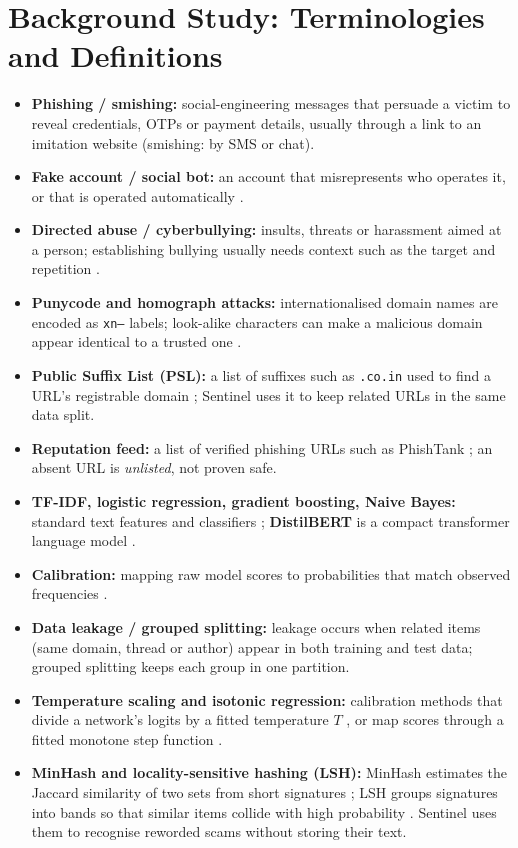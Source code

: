 \section{Background Study: Terminologies and Definitions}
\begin{itemize}
\item \textbf{Phishing / smishing:} social-engineering messages that persuade a victim to reveal credentials, OTPs or payment details, usually through a link to an imitation website (smishing: by SMS or chat).
\item \textbf{Fake account / social bot:} an account that misrepresents who operates it, or that is operated automatically \cite{lit3}.
\item \textbf{Directed abuse / cyberbullying:} insults, threats or harassment aimed at a person; establishing bullying usually needs context such as the target and repetition \cite{cad}.
\item \textbf{Punycode and homograph attacks:} internationalised domain names are encoded as \texttt{xn--} labels; look-alike characters can make a malicious domain appear identical to a trusted one \cite{homograph}.
\item \textbf{Public Suffix List (PSL):} a list of suffixes such as \texttt{.co.in} used to find a URL's registrable domain \cite{psl}; Sentinel uses it to keep related URLs in the same data split.
\item \textbf{Reputation feed:} a list of verified phishing URLs such as PhishTank \cite{phishtank}; an absent URL is \emph{unlisted}, not proven safe.
\item \textbf{TF-IDF, logistic regression, gradient boosting, Naive Bayes:} standard text features and classifiers \cite{sklearn}; \textbf{DistilBERT} is a compact transformer language model \cite{distilbert}.
\item \textbf{Calibration:} mapping raw model scores to probabilities that match observed frequencies \cite{platt,guo}.
\item \textbf{Data leakage / grouped splitting:} leakage occurs when related items (same domain, thread or author) appear in both training and test data; grouped splitting keeps each group in one partition.
\item \textbf{Temperature scaling and isotonic regression:} calibration methods that divide a network's logits by a fitted temperature $T$ \cite{guo}, or map scores through a fitted monotone step function \cite{zadrozny}.
\item \textbf{MinHash and locality-sensitive hashing (LSH):} MinHash estimates the Jaccard similarity of two sets from short signatures \cite{broder}; LSH groups signatures into bands so that similar items collide with high probability \cite{mmds}. Sentinel uses them to recognise reworded scams without storing their text.

\end{itemize}
